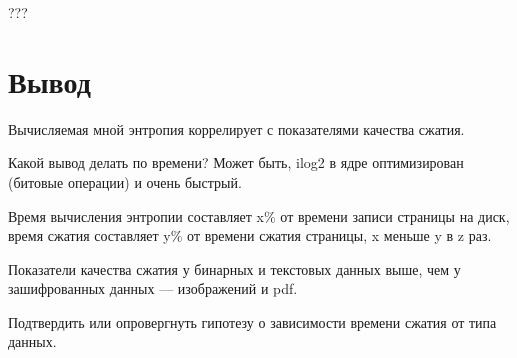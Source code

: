 ???

\section*{Вывод}

Вычисляемая мной энтропия коррелирует с показателями качества сжатия.

Какой вывод делать по времени? Может быть, ilog2 в ядре оптимизирован (битовые операции) и очень быстрый.

Время вычисления энтропии составляет x\% от времени записи страницы на диск, время сжатия составляет y\% от времени сжатия страницы, x меньше y в z раз.

Показатели качества сжатия у бинарных и текстовых данных выше, чем у зашифрованных данных --- изображений и pdf.

Подтвердить или опровергнуть гипотезу о зависимости времени сжатия от типа данных.